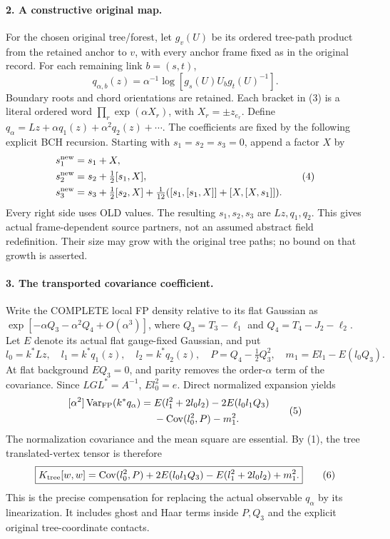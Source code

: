 \documentclass[11pt]{article}
\begin{document}
\paragraph{2. A constructive original map.}
For the chosen original tree/forest, let $g_v(U)$ be its ordered
tree-path product from the retained anchor to $v$, with every anchor
frame fixed as in the original record. For each remaining link
$b=(s,t)$,
\[
 q_{\alpha,b}(z)=\alpha^{-1}\log
                  [g_s(U)U_b g_t(U)^{-1}]. \tag{3}
\]
Boundary roots and chord orientations are retained. Each bracket in
(3) is a literal ordered word $\prod_r\exp(\alpha X_r)$, with
$X_r=\pm z_{e_r}$. Define $q_\alpha=Lz+\alpha q_1(z)+\alpha^2q_2(z)+\cdots$.
The coefficients are fixed by the following explicit BCH recursion.
Starting with $s_1=s_2=s_3=0$, append a factor $X$ by
\[
 \begin{split}
 s_1^{\rm new}&=s_1+X,\\
 s_2^{\rm new}&=s_2+\tfrac12[s_1,X],\\
 s_3^{\rm new}&=s_3+\tfrac12[s_2,X]
   +\tfrac1{12}([s_1,[s_1,X]]+[X,[X,s_1]]).
 \end{split} \tag{4}
\]
Every right side uses OLD values. The resulting $s_1,s_2,s_3$ are
$Lz,q_1,q_2$. This gives actual frame-dependent source partners,
not an assumed abstract field redefinition. Their size may grow with
the original tree paths; no bound on that growth is asserted.

\paragraph{3. The transported covariance coefficient.}
Write the COMPLETE local FP density relative to its flat Gaussian as
$\exp[-\alpha Q_3-\alpha^2Q_4+O(\alpha^3)]$, where
$Q_3=T_3-\ell_1$ and $Q_4=T_4-J_2-\ell_2$.
Let $E$ denote its actual flat gauge-fixed Gaussian, and put
\[
 l_0=k^*Lz,\quad l_1=k^*q_1(z),\quad l_2=k^*q_2(z),\quad
 P=Q_4-\tfrac12Q_3^2,\quad m_1=El_1-E(l_0Q_3).
\]
At flat background $EQ_3=0$, and parity removes the order-$\alpha$
term of the covariance. Since $LGL^*=A^{-1}$, $El_0^2=e$.
Direct normalized expansion yields
\[
 \begin{split}
 [\alpha^2]\operatorname{Var}_{\rm FP}(k^*q_\alpha)
 ={}&E(l_1^2+2l_0l_2)-2E(l_0l_1Q_3)\\
 &-\operatorname{Cov}(l_0^2,P)-m_1^2 .
 \end{split} \tag{5}
\]
The normalization covariance and the mean square are essential.
By (1), the tree translated-vertex tensor is therefore
\[
 \boxed{K_{\rm tree}[w,w]=\operatorname{Cov}(l_0^2,P)
       +2E(l_0l_1Q_3)-E(l_1^2+2l_0l_2)+m_1^2.} \tag{6}
\]
This is the precise compensation for replacing the actual observable
$q_\alpha$ by its linearization. It includes ghost and Haar terms
inside $P,Q_3$ and the explicit original tree-coordinate contacts.
\end{document}
